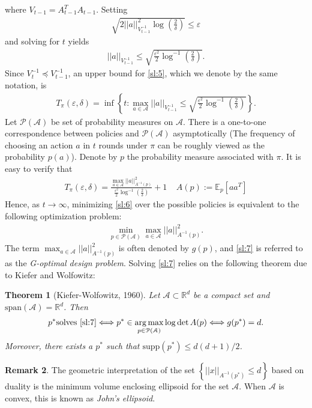 \documentclass[10pt,a4article]{amsart}
\numberwithin{equation}{section}
\theoremstyle{plain}
\newtheorem{Th}{Theorem}
\theoremstyle{definition}
\newtheorem{Rem}[Th]{Remark}
\def\R{{\mathbb R}}
\def\E{{\mathbb E}}
\def\R{{\mathbb R}}
\def\e{{\varepsilon}}
\DeclareMathOperator*{\argmax}{arg\,max}
\begin{document}
where $V_{t-1} = A^T_{t-1}A_{t-1}$. Setting 
\begin{align*}
\sqrt{2||a||^2_{V_{t-1}^{-1}}\log\left(\frac{2}{\delta}\right)}\leq\e
\end{align*}
and solving for $t$ yields
\begin{align*}
||a||_{V_{t-1}^{-1}}\leq\sqrt{\frac{\e^2}{2}\log^{-1}\left(\frac{2}{\delta}\right)}.
\end{align*}
Since $V_t^{-1}\preceq V^{-1}_{t-1}$, an upper bound for \eqref{sl:5}, which we denote by the same notation, is
\begin{align}
T_{\pi}(\e, \delta) = \inf\left\{t: \max_{a\in\mathcal A}||a||_{V_{t-1}^{-1}}\leq \sqrt{\frac{\e^2}{2}\log^{-1}\left(\frac{2}{\delta}\right)}\right\}.\label{sl:6}
\end{align}
Let $\mathcal P(\mathcal A)$ be set of probability measures on $\mathcal A$. There is a one-to-one correspondence between policies and $\mathcal P(\mathcal A)$ asymptotically (The frequency of choosing an action $a$ in $t$ rounds under $\pi$ can be roughly viewed as the probability $p(a)$). Denote by $p$ the probability measure associated with $\pi$. It is easy to verify that 
\begin{align*}
T_{\pi}(\e, \delta) = \frac{\max_{a\in\mathcal A}||a||^2_{A^{-1}(p)}}{\frac{\e^2}{2}\log^{-1}\left(\frac{2}{\delta}\right)}+1\ \ \ \ \ A(p):=\E_p[aa^T]
\end{align*}
Hence, as $t\to\infty$, minimizing \eqref{sl:6} over the possible policies is equivalent to the following optimization problem:
\begin{align}
\min_{p\in\mathcal P(\mathcal A)}\max_{a\in\mathcal A}||a||^2_{A^{-1}(p)}.\label{sl:7}
\end{align}
The term $\max_{a\in\mathcal A}||a||^2_{A^{-1}(p)}$ is often denoted by $g(p)$, and \eqref{sl:7} is referred to as the \emph{G-optimal design problem}. Solving \eqref{sl:7} relies on the following theorem due to Kiefer and Wolfowitz:
\begin{Th}[Kiefer-Wolfowitz, 1960]\label{KW}
Let $\mathcal A\subset\R^d$ be a compact set and $\text{span}(\mathcal A)=\R^d$. Then
\begin{align*}
p^*\text{solves \eqref{sl:7}}\Longleftrightarrow p^*\in\argmax_{p\in\mathcal P(\mathcal A)}\log\det A(p)\Longleftrightarrow g(p^*) = d. 
\end{align*}
Moreover, there exists a $p^*$ such that $\text{supp}(p^*)\leq d(d+1)/2$. 
\end{Th}
\begin{Rem}
The geometric interpretation of the set $\left\{||x||_{A^{-1}(p^*)}\leq d\right\}$ based on duality is the minimum volume enclosing ellipsoid for the set $\mathcal A$. When $\mathcal A$ is convex, this is known as \emph{John's ellipsoid}.  
\end{Rem}
\end{document}
